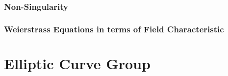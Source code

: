 \documentclass[12pt,openany]{book}
\theoremstyle{definition}
\begin{document}
	\subsection{Non-Singularity}
	
	\subsection{Weierstrass Equations in terms of Field Characteristic}

	\newpage
	\chapter{Elliptic Curve Group}
	\iffalse
	\begin{tikzpicture}[scale=0.5]
	\draw[->] (-5,0) -- (5,0) node[right] {$x$};
	\draw[->] (0,-5) -- (0,5) node[above] {$y$};
	
	\draw plot[domain=-2:2] (\x,{sqrt(\x*\x*\x - \x + 2)});
	\draw plot[domain=-2:2] (\x,{-sqrt(\x*\x*\x - \x + 2)});
	
	\fill (-1, sqrt(-1*-1*-1 + 1 + 2)) circle (4pt) node[above left] {$P$};
	\fill (1, sqrt(1*1*1 - 1 + 2)) circle (4pt) node[above right] {$Q$};
	
	\draw[->, dashed] (-3, {-sqrt(-3*-3*-3 + 3 + 2)}) -- (3, {sqrt(3*3*3 - 3 + 2)}) node[right] {$-R$};
	
	\fill (3, -sqrt(3*3*3 - 3 + 2)) circle (4pt) node[below right] {$R=P+Q$};
	
	\end{tikzpicture}
	\fi
	
	\begin{tcolorbox}[colback=white,colframe=lemcolor,arc=5pt,title={\color{white}\bf }]
		
	\end{tcolorbox}
	
	\begin{tcolorbox}[colback=white,colframe=lemcolor,arc=5pt,title={\color{white}\bf }]
		
	\end{tcolorbox}
	
	\begin{tcolorbox}[colback=white,colframe=lemcolor,arc=5pt,title={\color{white}\bf }]
		
	\end{tcolorbox}
	
	\begin{tcolorbox}[colback=white,colframe=lemcolor,arc=5pt,title={\color{white}\bf }]
		
	\end{tcolorbox}
	
\end{document}
